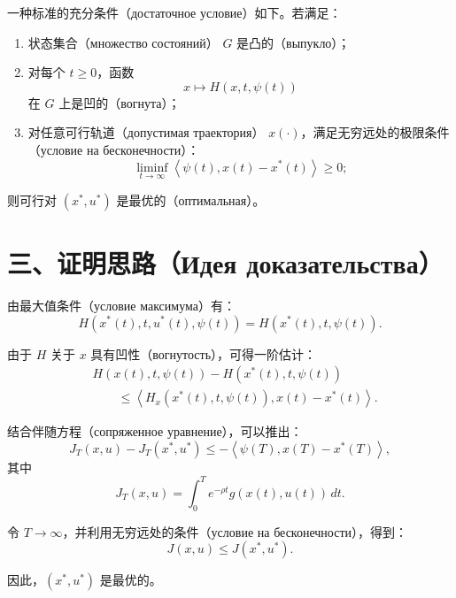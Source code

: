 \documentclass[12pt,a4paper]{article}
\newcommand{\term}[2]{#1（#2）}
\newcommand{\inner}[2]{\left\langle #1,#2\right\rangle}
\begin{document}
一种标准的\term{充分条件}{достаточное условие}如下。若满足：

\begin{enumerate}
    \item \term{状态集合}{множество состояний} $G$ 是\term{凸的}{выпукло}；
    \item 对每个 $t\ge 0$，函数
    \begin{equation}
        x\mapsto H(x,t,\psi(t))
    \end{equation}
    在 $G$ 上是\term{凹的}{вогнута}；
    \item 对任意\term{可行轨道}{допустимая траектория} $x(\cdot)$，满足无穷远处的\term{极限条件}{условие на бесконечности}：
    \begin{equation}
        \liminf_{t\to\infty}\inner{\psi(t)}{x(t)-x^*(t)}\ge 0;
    \end{equation}
\end{enumerate}

则可行对 $(x^*,u^*)$ 是\term{最优的}{оптимальная}。

\section*{三、证明思路（Идея доказательства）}

由\term{最大值条件}{условие максимума}有：
\begin{equation}
    H(x^*(t),t,u^*(t),\psi(t))
    =H(x^*(t),t,\psi(t)).
\end{equation}

由于 $H$ 关于 $x$ 具有\term{凹性}{вогнутость}，可得一阶估计：
\begin{equation}
\begin{aligned}
    &H(x(t),t,\psi(t))-H(x^*(t),t,\psi(t))\\
    &\qquad\le
    \inner{H_x(x^*(t),t,\psi(t))}{x(t)-x^*(t)}.
\end{aligned}
\end{equation}

结合\term{伴随方程}{сопряженное уравнение}，可以推出：
\begin{equation}
    J_T(x,u)-J_T(x^*,u^*)
    \le
    -\inner{\psi(T)}{x(T)-x^*(T)},
\end{equation}
其中
\begin{equation}
    J_T(x,u)=\int_0^T e^{-\rho t}g(x(t),u(t))\,dt.
\end{equation}

令 $T\to\infty$，并利用无穷远处的条件（условие на бесконечности），得到：
\begin{equation}
    J(x,u)\le J(x^*,u^*).
\end{equation}

因此，$(x^*,u^*)$ 是最优的。
\end{document}
